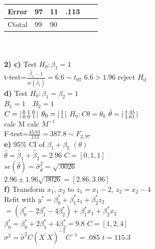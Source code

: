 \documentclass[10pt,landscape]{article}
\newenvironment{lmat}
{\left|\begin{smallmatrix}}
	{\end{smallmatrix}\right|}
\newcommand{\B}{\beta}
\newcommand{\sg}{\sigma}
\newcommand{\hb}{\hat{\beta}}
\newcommand{\hth}{\hat{\theta}}
\begin{document}
\begin{multicols*}{4}
{\begin{tabular}{l|l|l|l|l|l}
	Error& 97 & 11  & .113 &  \\
	\hline
	Ctotal&99  &90 &  & \\
	\hline
\end{tabular}}\\
\\
\textbf{2) c)} Test $H_0:\B_1=1$\\
t-test=$\frac{\hb_1-1}{se(\hb_1)}=6.6\sim t_{97}$ $6.6>1.96$ reject $H_0$\\
\textbf{d)} Test $H_0:\B_1=\B_2=1$\\
$B_1=1 \quad B_2=1$ \\
$C=\begin{lmat}
0&1&0\\
0&0&1
\end{lmat}$ $\theta_0=\begin{lmat}
1\\
1
\end{lmat}$ $H_0:C\theta=\theta_0$ $\hat{\theta}=\begin{lmat}
1.35\\
1.61
\end{lmat}$\\
calc M \quad calc $M^{-1}$\\
F-test=$\frac{43.83}{.113}=387.8\sim F_{2,97}$\\
\textbf{e)} 95\% CI of $\B_1+\B_2$ $(\theta)$\\
$\hth=\hb_1+\hb_2=2.96$ $C=[0,1,1]$\\
$se(\hth)=\hat{\sg}^2_{\hth}=\sqrt{.0026}$\\
$2.96\pm 1.96\sqrt{.0026}=[2.86,3.06]$\\
\textbf{f)} Transform $x_1$, $x_2$ to $z_1=x_1-2$, $z_2=x_2-4$\\
Refit with $y^*=\B_0^*+\B_1^*z_1+\B_2^*z_2$\\
$=(\B_0^*-2\B_1^*-4\B_2^*)+\B_1^*x_1+\B_2^*x_2$\\
$\B_0^*=\B_0^*+2\B_1^*+4\B_2^*=9.8$ $C=[1,2,4]$\\
$\sg^2=\hat{\sg}^2C(X^{'}X)^{-1}C^{-1}=.085$ $t=115.3$\\

\end{multicols*}
\end{document}
